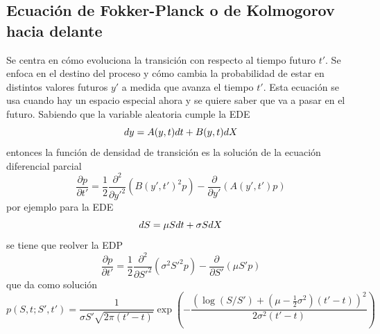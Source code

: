 \subsection{Ecuación de Fokker-Planck o de Kolmogorov hacia delante}
Se centra en cómo evoluciona la transición con respecto al tiempo futuro $t'$. Se enfoca en el destino del proceso y cómo cambia la probabilidad de estar en distintos valores futuros $y'$ a medida que avanza el tiempo $t'$. Esta ecuación se usa cuando hay un espacio especial ahora y se quiere saber que va a pasar en el futuro. Sabiendo que la variable aleatoria cumple la EDE
\[
    dy = A(y, t) dt + B(y, t) d\mathnormal{X}
\]
entonces la función de densidad de transición es la solución de la ecuación diferencial parcial
\[
    \boxed{\frac{\partial p}{\partial t'} = \frac{1}{2} \frac{\partial^2}{\partial y'^2} \left( B(y', t')^2 p \right) - \frac{\partial}{\partial y'} \left( A(y', t') p \right)}
\]
por ejemplo para la EDE
\[
    dS = \mu S dt + \sigma S d\mathnormal{X}
\]
se tiene que reolver la EDP
\[
    \frac{\partial p}{\partial t'} = \frac{1}{2} \frac{\partial^2}{\partial S'^2} \left( \sigma^2 S'^2 p \right) - \frac{\partial}{\partial S'} \left( \mu S' p \right)
\]
que da como solución
\[
    p(S, t; S', t') = \frac{1}{\sigma S' \sqrt{2\pi (t'-t)}} \exp\left( -\frac{ \left( \log(S/S') + (\mu - \frac{1}{2}\sigma^2)(t'-t) \right)^2 }{ 2\sigma^2 (t'-t) } \right)
\]
